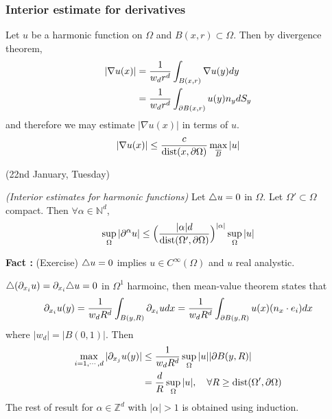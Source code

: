 \documentclass[12pt,a4paper]{article}
\newenvironment{proof}
{\begin{changemargin}{1cm}{0.5cm} 
	}%
	{\end{changemargin}
}
\newenvironment{p}
{\begin{proof} 
	}%
	{\end{proof}
}
\begin{document}
\subsubsection*{Interior estimate for derivatives}

Let $u$ be a harmonic function on $\Omega$ and $B(x, r) \subset \Omega$. Then by divergence theorem,
\begin{align*}
|\nabla u(x)| &= \frac{1}{w_d r^d} \int_{B(x, r)} \nabla u(y) dy \\
& = \frac{1}{w_d r^d} \int_{\partial B(x, r)} u(y) n_y dS_y
\end{align*}
and therefore we may estimate $|\nabla u(x)|$ in terms of $u$.
\begin{align*}
|\nabla u(x)| \leq \frac{c}{\text{dist}(x, \partial \Omega)} \max_{\overline{B}} |u|
\end{align*}
\s

\newday

(22nd January, Tuesday)
\s



 \emph{(Interior estimates for harmonic functions)} Let $\triangle u =0$ in $\Omega$. Let $\Omega' \subset \Omega$ compact. Then $\forall \alpha \in \mathbb{N}^d$,
\begin{align*}
\sup_{\Omega} |\partial^{\alpha}u| \leq \Big( \frac{|\alpha|d}{\text{dist}(\Omega', \partial \Omega)}\Big)^{|\alpha|} \sup_{\Omega} |u|
\end{align*}
\begin{p}
\textbf{Fact :} (Exercise) $\triangle u= 0$ implies $u\in C^{\infty}(\Omega)$ and $u$ real analystic.

\pf $\triangle(\partial_{x_i} u) = \partial_{x_i} \triangle u =0$ in $\Omega^1$ harmoinc, then mean-value theorem states that
\begin{align*}
\partial_{x_i} u(y) = \frac{1}{w_d R^d} \int_{B(y ,R)} \partial_{x_i} u dx = \frac{1}{w_d R^d} \int_{\partial B(y, R)} u(x) (n_x \cdot e_i) dx
\end{align*}
where $|w_d| = |B(0,1)|$. Then
\begin{align*}
\max_{i=1, \cdots, d} |\partial_{x_{j}} u(y)| & \leq \frac{1}{w_d R^d} \sup_{\Omega} |u| |\partial B(y, R)|\\
& = \frac{d}{R} \sup_{\Omega}|u|, \quad \forall R \geq \text{dist}(\Omega', \partial \Omega)
\end{align*}
The rest of result for $\alpha \in \mathbb{Z}^d$ with $|\alpha|>1$ is obtained using induction.

\eop
\end{p}
\s
\end{document}

